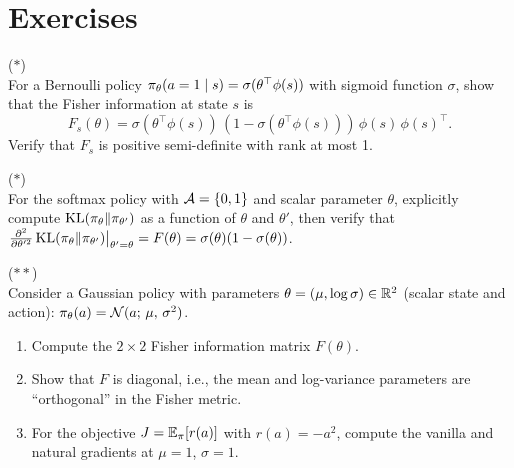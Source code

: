 \documentclass[11pt,a4paper]{article}
\begin{document}
\section{Exercises}

\begin{exercise}
\textnormal{(\(*\))} \\
  For a Bernoulli policy $\pi_\theta(a=1 \mid s) = \sigma(\theta^\top
  \phi(s))$ with sigmoid function $\sigma$, show that the Fisher
  information at state $s$ is
  \[
    F_s(\theta) = \sigma(\theta^\top \phi(s))\,
    (1 - \sigma(\theta^\top \phi(s)))\, \phi(s)\, \phi(s)^\top.
  \]
  Verify that $F_s$ is positive semi-definite with rank at most 1.
\end{exercise}

\begin{exercise}
\textnormal{(\(*\))} \\
  For the softmax policy with $\mathcal{A} = \{0, 1\}$ and scalar parameter
  $\theta$, explicitly compute $\operatorname{KL}(\pi_\theta \| \pi_{\theta'})$
  as a function of $\theta$ and $\theta'$, then verify that
  $\frac{\partial^2}{\partial \theta'^2}
  \operatorname{KL}(\pi_\theta \| \pi_{\theta'})\big|_{\theta'=\theta}
  = F(\theta) = \sigma(\theta)(1-\sigma(\theta))$.
\end{exercise}

\begin{exercise}
\textnormal{(\(**\))} \\
  Consider a Gaussian policy with parameters $\theta = (\mu, \log\sigma)
  \in \mathbb{R}^2$ (scalar state and action): $\pi_\theta(a) =
  \mathcal{N}(a;\, \mu,\, \sigma^2)$.
  \begin{enumerate}[label=(\alph*)]
    \item Compute the $2 \times 2$ Fisher information matrix $F(\theta)$.
    \item Show that $F$ is diagonal, i.e., the mean and log-variance
      parameters are ``orthogonal'' in the Fisher metric.
    \item For the objective $J = \mathbb{E}_\pi[r(a)]$ with $r(a) = -a^2$,
      compute the vanilla and natural gradients at $\mu = 1$,
      $\sigma = 1$.
  \end{enumerate}
\end{exercise}
\end{document}

